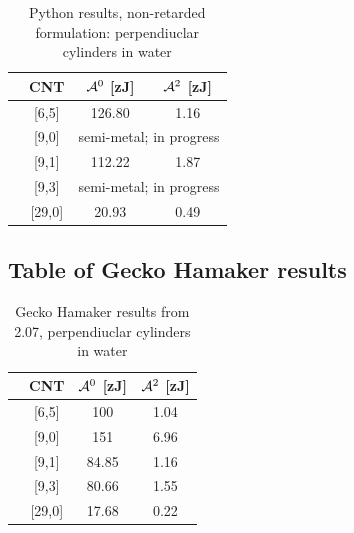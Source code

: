 \documentclass[a4paper]{article}
\begin{document}
\begin{center}
\begin{table}[ht]
\caption{Python results, non-retarded formulation: perpendiuclar cylinders in water}%
\centering
\begin{tabular}{r c | c | c}
  \hline
  &\hspace{0.25in}CNT\hspace{0.25in}&\hspace{0.25in}${\cal A}^{0}$ [zJ]
  \hspace{0.25in}& \hspace{0.25in}${\cal A}^{2}$    [zJ] \hspace{0.25in}\\
  \hline\hline                       
  &[6,5]  & 126.80 & 1.16 \\
  \hline
  &[9,0]  & \multicolumn{2}{c}{semi-metal; in progress}\\
  \hline
  &[9,1]  & 112.22 & 1.87 \\
  \hline
  &[9,3]  & \multicolumn{2}{c}{semi-metal; in progress}\\
  \hline
  &[29,0] & 20.93 & 0.49 \\
  \hline  
\end{tabular}
\label{table:nonlin}
\end{table}

\subsection{Table of Gecko Hamaker results}
\begin{table}[ht]
\caption{Gecko Hamaker results from 2.07, perpendiuclar cylinders in water}
\centering
\begin{tabular}{l c|c|c}
  \hline  
  &\hspace{0.25in}CNT \hspace{0.25in}& \hspace{0.25in}${\cal A}^{0}$    [zJ]
  \hspace{0.25in}& \hspace{0.25in}${\cal A}^{2}$    [zJ] \hspace{0.25in}\\
  \hline\hline 
  &[6,5]  & 100 & 1.04 \\
  \hline
  &[9,0]  & 151 & 6.96 \\
  \hline
  &[9,1]  & 84.85 & 1.16 \\
  \hline
  &[9,3]  & 80.66 & 1.55 \\
  \hline
  &[29,0] & 17.68 & 0.22 \\
  \hline  
\end{tabular}
\label{table:nonlin}
\end{table}

\end{center}
\end{document}
